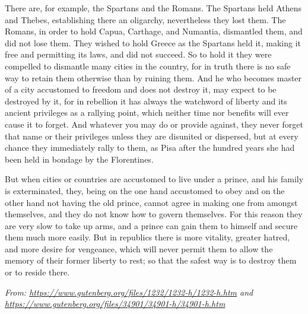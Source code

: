 \begin{linenumbers*}
\indent There are, for example, the Spartans and the Romans. The Spartans held Athens and Thebes, establishing there an oligarchy, nevertheless they lost them. The Romans, in order to hold Capua, Carthage, and Numantia, dismantled them, and did not lose them. They wished to hold Greece as the Spartans held it, making it free and permitting its laws, and did not succeed. So to hold it they were compelled to dismantle many cities in the country, for in truth there is no safe way to retain them otherwise than by ruining them. And he who becomes master of a city accustomed to freedom and does not destroy it, may expect to be destroyed by it, for in rebellion it has always the watchword of liberty and its ancient privileges as a rallying point, which neither time nor benefits will ever cause it to forget. And whatever you may do or provide against, they never forget that name or their privileges unless they are disunited or dispersed, but at every chance they immediately rally to them, as Pisa after the hundred years she had been held in bondage by the Florentines.

\indent But when cities or countries are accustomed to live under a prince, and his family is exterminated, they, being on the one hand accustomed to obey and on the other hand not having the old prince, cannot agree in making one from amongst themselves, and they do not know how to govern themselves. For this reason they are very slow to take up arms, and a prince can gain them to himself and secure them much more easily. But in republics there is more vitality, greater hatred, and more desire for vengeance, which will never permit them to allow the memory of their former liberty to rest; so that the safest way is to destroy them or to reside there.
\end{linenumbers*}

\bigskip
\textit{From: \url{https://www.gutenberg.org/files/1232/1232-h/1232-h.htm} and \url{https://www.gutenberg.org/files/34901/34901-h/34901-h.htm}}

